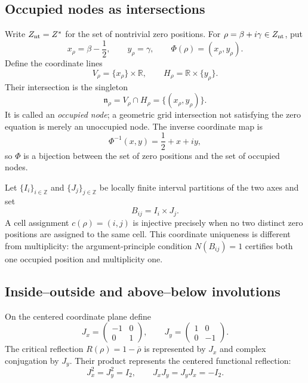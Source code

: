 \documentclass[11pt]{amsart}
\theoremstyle{definition}
\theoremstyle{remark}
\begin{document}
\subsection{Occupied nodes as intersections}
Write $Z_{\rm nt}=Z^*$ for the set of nontrivial zero positions.  For
$\rho=\beta+i\gamma\in Z_{\rm nt}$, put
\begin{equation}\label{eq:node-coordinate-map}
 x_\rho=\beta-\frac12,
 \qquad y_\rho=\gamma,
 \qquad \Phi(\rho)=(x_\rho,y_\rho).
\end{equation}
Define the coordinate lines
\begin{equation}\label{eq:coordinate-lines}
 V_\rho=\{x_\rho\}\times\mathbb R,
 \qquad H_\rho=\mathbb R\times\{y_\rho\}.
\end{equation}
Their intersection is the singleton
\begin{equation}\label{eq:occupied-node}
 \mathfrak n_\rho=V_\rho\cap H_\rho=\{(x_\rho,y_\rho)\}.
\end{equation}
It is called an \emph{occupied node}; a geometric grid intersection not satisfying the zero
equation is merely an unoccupied node.  The inverse coordinate map is
\begin{equation}\label{eq:node-coordinate-inverse}
 \Phi^{-1}(x,y)=\frac12+x+iy,
\end{equation}
so $\Phi$ is a bijection between the set of zero positions and the set of occupied nodes.

Let $\{I_i\}_{i\in\mathbb Z}$ and $\{J_j\}_{j\in\mathbb Z}$ be locally finite interval
partitions of the two axes and set
\begin{equation}\label{eq:grid-cells}
 B_{ij}=I_i\times J_j.
\end{equation}
A cell assignment $c(\rho)=(i,j)$ is injective precisely when no two distinct zero positions
are assigned to the same cell.  This coordinate uniqueness is different from multiplicity:
the argument-principle condition $N(B_{ij})=1$ certifies both one occupied position and
multiplicity one.

\subsection{Inside--outside and above--below involutions}
On the centered coordinate plane define
\begin{equation}\label{eq:two-coordinate-involutions}
 J_x=\begin{pmatrix}-1&0\\0&1\end{pmatrix},
 \qquad
 J_y=\begin{pmatrix}1&0\\0&-1\end{pmatrix}.
\end{equation}
The critical reflection $R(\rho)=1-\overline\rho$ is represented by $J_x$ and complex
conjugation by $J_y$.  Their product represents the centered functional reflection:
\begin{equation}\label{eq:klein-relations}
 J_x^2=J_y^2=I_2,
 \qquad J_xJ_y=J_yJ_x=-I_2.
\end{equation}
\end{document}
